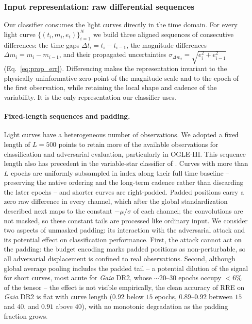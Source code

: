 \documentclass{aa}
\begin{document}
\subsubsection{Input representation: raw differential sequences} \label{sec:input_rep}

Our classifier consumes the light curves directly in the time domain. For every light curve $\{(t_i, m_i, e_i)\}_{i=1}^{N}$ we build three aligned sequences of consecutive differences: the time gaps $\Delta t_i = t_i - t_{i-1}$, the magnitude differences $\Delta m_i = m_i - m_{i-1}$, and their propagated uncertainties $\sigma_{\Delta m_i} = \sqrt{e_i^2 + e_{i-1}^2}$ (Eq.~\eqref{eq:prop_err}). Differencing makes the representation invariant to the physically uninformative zero-point of the magnitude scale and to the epoch of the first observation, while retaining the local shape and cadence of the variability. It is the only representation our classifier uses.

\paragraph{Fixed-length sequences and padding.} Light curves have a
heterogeneous number of observations. We adopted a fixed length of $L = 500$ points to retain more of the available observations for classification and adversarial evaluation, particularly in OGLE-III. This sequence length also has precedent in the variable-star classifier of \citet{aguirre2019deep}. Curves with more than $L$ epochs are uniformly
subsampled in index along their full time baseline -- preserving the
native ordering and the long-term cadence rather than discarding the
later epochs -- and shorter curves are right-padded. Padded positions
carry a zero raw difference in every channel, which after the global
standardization described next maps to the constant $-\mu/\sigma$ of each
channel; the convolutions are not masked, so these constant tails are
processed like ordinary input. We consider two aspects of unmasked padding: its interaction with the adversarial attack and its potential effect on classification performance. First, the attack cannot act on the padding: the budget encoding marks padded positions as non-perturbable, so all adversarial displacement is confined to real observations. Second, although global average pooling includes the padded tail -- a potential dilution of the signal for short curves, most acute for \textit{Gaia} DR2, whose ${\sim}20$--$30$ epochs occupy $<6\%$ of the tensor -- the effect is not visible empirically, the clean accuracy of RRE on \textit{Gaia} DR2 is flat with curve length ($0.92$ below $15$ epochs, $0.89$--$0.92$ between $15$ and $40$, and $0.91$ above $40$), with no monotonic degradation as the padding fraction grows.
\end{document}
